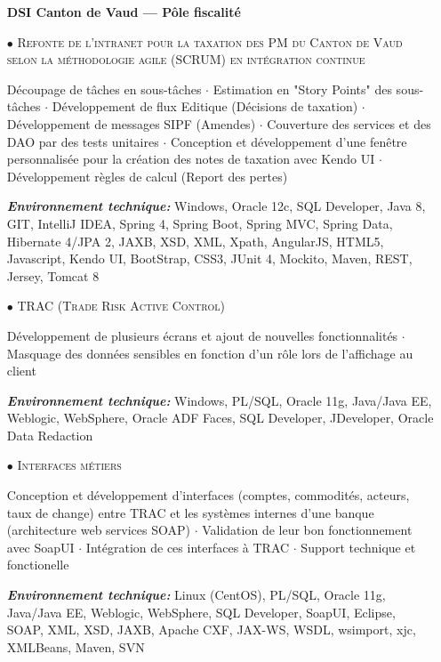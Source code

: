 \documentclass[10pt,a4paper]{moderncv}
\begin{document}
\vspace{1cm}

\begin{itemize}

	\item[] \textbf{DSI Canton de Vaud --- Pôle fiscalité}
	
	\item[$\bullet$] \textsc{Refonte de l’intranet pour la taxation des PM du Canton de Vaud selon la méthodologie agile (SCRUM) en intégration continue}
	\item[] Découpage de tâches en sous-tâches $\cdot$ Estimation en "Story Points" des sous-tâches $\cdot$ Développement de flux Editique (Décisions de taxation) $\cdot$ Développement de messages SIPF (Amendes) $\cdot$ Couverture des services et des DAO par des tests unitaires $\cdot$ Conception et développement d'une fenêtre personnalisée pour la création des notes de taxation avec Kendo UI $\cdot$ Développement règles de calcul (Report des pertes)
	\item[] \emph{\textbf{Environnement technique:}} Windows, Oracle 12c, SQL Developer, Java 8, GIT, IntelliJ IDEA, Spring 4, Spring Boot, Spring MVC, Spring Data, Hibernate 4/JPA 2, JAXB, XSD, XML, Xpath, AngularJS, HTML5, Javascript, Kendo UI, BootStrap, CSS3, JUnit 4, Mockito, Maven, REST, Jersey, Tomcat 8	
\end{itemize}


\clearpage

\begin{itemize}
		
	\item[$\bullet$] \textsc{TRAC (Trade Risk Active Control)}
	\item[] Développement de plusieurs écrans et ajout de nouvelles fonctionnalités $\cdot$ Masquage des données sensibles en fonction d'un rôle lors de l'affichage au client
	\item[] \emph{\textbf{Environnement technique:}} Windows, PL/SQL, Oracle 11g, Java/Java EE, Weblogic, WebSphere, Oracle ADF Faces, SQL Developer, JDeveloper, Oracle Data Redaction

	\item[$\bullet$] \textsc{Interfaces métiers}
	\item[] Conception et développement d'interfaces (comptes, commodités, acteurs, taux de change) entre TRAC et les systèmes internes d'une banque (architecture web services SOAP) $\cdot$ Validation de leur bon fonctionnement avec SoapUI $\cdot$ Intégration de ces interfaces à TRAC $\cdot$  Support technique et fonctionelle
	\item[] \emph{\textbf{Environnement technique:}} Linux (CentOS), PL/SQL, Oracle 11g, Java/Java EE, Weblogic, WebSphere, SQL Developer, SoapUI, Eclipse, SOAP, XML, XSD, JAXB, Apache CXF, JAX-WS, WSDL, wsimport, xjc, XMLBeans, Maven, SVN	      	      	
\end{itemize}
\end{document}
